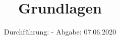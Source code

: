 

\subject{TPS Praktikum}
\title{Grundlagen}
\date{%
	Durchführung: -
	\hspace{3em}
	Abgabe: 07.06.2020
}



\maketitle
\thispagestyle{empty}
\tableofcontents
\newpage
\setlength{\parindent}{0em}





